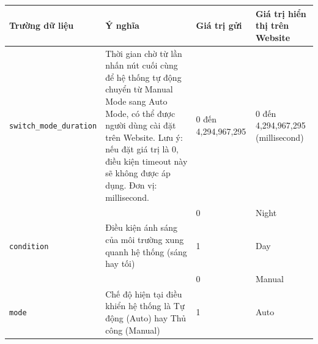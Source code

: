 {\begin{table}[H]
\centering
\small
\begin{tabular}{|p{4cm}|p{5cm}|p{2.5cm}|p{3.5cm}|}
\hline
{\textbf{Trường dữ liệu}}        & {\textbf{Ý nghĩa}}                                                                                                                                                                                                                              & {\textbf{Giá trị gửi}} & {\textbf{Giá trị hiển thị trên Website}}                                  \\ \hline
{\texttt{switch\_mode\_duration}}         & {Thời gian chờ từ lần nhấn nút cuối cùng để hệ thống tự động chuyển từ Manual Mode sang Auto Mode, có thể được người dùng cài đặt trên Website. Lưu ý: nếu đặt giá trị là 0, điều kiện timeout này sẽ không được áp dụng. Đơn vị: millisecond.} & {0 đến 4,294,967,295}  & {0 đến 4,294,967,295 (millisecond)}                                       \\ \hline
{}                               & {}                                                                                                                                                                                                                                              & {0}                    & {Night}                                                                   \\ \cline{3-4} 
\multirow{-2}{*}{{\texttt{condition}}}    & {Điều kiện ánh sáng của môi trường xung quanh hệ thống (sáng hay tối)}                                                                                                                                                        & {1}                    & {Day}                                                               \\ \hline
{}                               & {}                                                                                                                                                                                                                                              & {0}                    & {Manual}                                                                  \\ \cline{3-4} 
\multirow{-2}{*}{{\texttt{mode}}}         & {{Chế độ hiện tại điều khiển hệ thống là Tự động (Auto) hay Thủ công (Manual)}}                                                                                                                                                 & {1}                    & {Auto}                                                                    \\ \hline

\end{tabular}
\end{table}}
